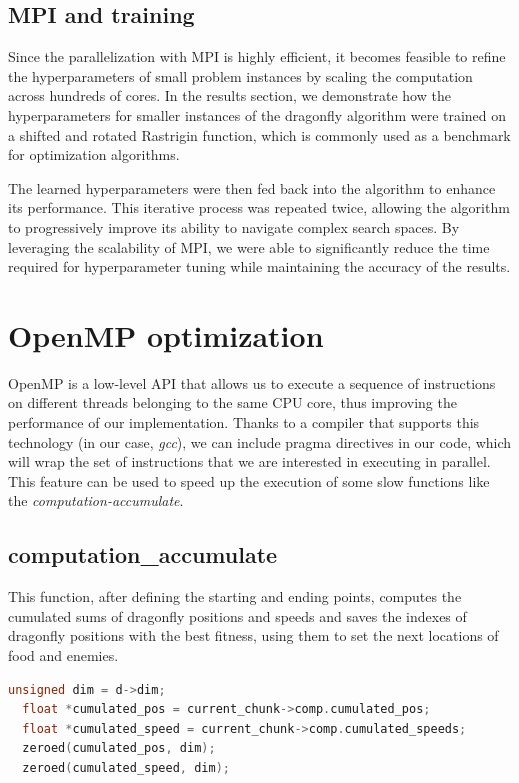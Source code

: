 \documentclass[10pt]{article}
\begin{document}
\begin{multicols}{2}
\subsection*{MPI and training}
Since the parallelization with MPI is highly efficient, it becomes feasible to refine the hyperparameters of small problem instances by scaling the computation across hundreds of cores.
In the results section, we demonstrate how the hyperparameters for smaller instances of the dragonfly algorithm were trained on a shifted and rotated Rastrigin function, which is commonly used as a benchmark for optimization algorithms.

The learned hyperparameters were then fed back into the algorithm to enhance its performance.
This iterative process was repeated twice, allowing the algorithm to progressively improve its ability to navigate complex search spaces.
By leveraging the scalability of MPI, we were able to significantly reduce the time required for hyperparameter tuning while maintaining the accuracy of the results.

\section{OpenMP optimization}

OpenMP is a low-level API that allows us to execute a sequence of instructions on different threads belonging
to the same CPU core, thus improving the performance of our implementation.
Thanks to a compiler that supports this technology (in our case, \textit{gcc}),
we can include pragma directives in our code,
which will wrap the set of instructions that we are interested in executing
in parallel. This feature can be used to 
speed up the execution of some slow functions like the \textit{computation-accumulate}.

\subsection*{computation\_accumulate}

This function, after defining the starting and ending points, computes
the cumulated sums of dragonfly positions and speeds 
and saves the indexes of dragonfly positions with the best fitness, using them
to set the next locations of food and enemies.

\begin{lstlisting}[language=C,caption={the serial version of \textit{computation\_accumulate}}]
  unsigned dim = d->dim;
  float *cumulated_pos = current_chunk->comp.cumulated_pos;
  float *cumulated_speed = current_chunk->comp.cumulated_speeds;
  zeroed(cumulated_pos, dim);
  zeroed(cumulated_speed, dim);


\end{lstlisting}
\end{multicols}
\end{document}

